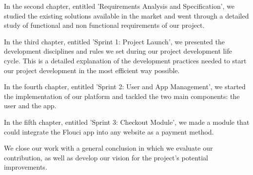 \begin{spacing}{1.1}
In the second chapter, entitled 'Requirements Analysis and Specification', we studied the existing solutions available in the market and went through a detailed study of functional and non functional requirements of our project.
\newline

In the third chapter, entitled 'Sprint 1:  Project Launch', we presented the development disciplines and rules we set during our project development life cycle. This is a detailed explanation of the development practices needed to start our project development in the most efficient way possible. 
\newline

In the fourth chapter, entitled 'Sprint 2:  User and App Management', we started the implementation of our platform and tackled the two main components: the user and the app.
\newline

In the fifth chapter, entitled 'Sprint 3:  Checkout Module', we made a module that could integrate the Flouci app into any website as a payment method.
 \newline
 
We close our work with a general conclusion in which we evaluate our contribution, as well as develop our vision for the project's potential improvements.



\end{spacing}
